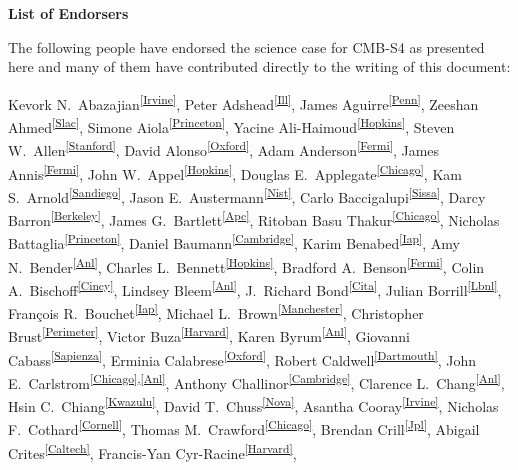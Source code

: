 \begin{center}
\textbf{List of Endorsers}
\end{center}

The following people have endorsed the science case for CMB-S4 as presented here and many of them have contributed directly to the writing of this document:

Kevork N.~Abazajian\textsuperscript{\ref{Irvine}},
Peter Adshead\textsuperscript{\ref{Ill}},
James Aguirre\textsuperscript{\ref{Penn}},
Zeeshan Ahmed\textsuperscript{\ref{Slac}},
Simone Aiola\textsuperscript{\ref{Princeton}},
Yacine Ali-Haimoud\textsuperscript{\ref{Hopkins}},
Steven W.~Allen\textsuperscript{\ref{Stanford}},
David Alonso\textsuperscript{\ref{Oxford}},
Adam Anderson\textsuperscript{\ref{Fermi}},
James Annis\textsuperscript{\ref{Fermi}},
John W.~Appel\textsuperscript{\ref{Hopkins}}, 
Douglas E.~Applegate\textsuperscript{\ref{Chicago}}, 
Kam S.~Arnold\textsuperscript{\ref{Sandiego}}, 
Jason E.~Austermann\textsuperscript{\ref{Nist}},
Carlo Baccigalupi\textsuperscript{\ref{Sissa}}, 
Darcy Barron\textsuperscript{\ref{Berkeley}}, 
James G.~Bartlett\textsuperscript{\ref{Apc}}, 
Ritoban Basu Thakur\textsuperscript{\ref{Chicago}},
Nicholas Battaglia\textsuperscript{\ref{Princeton}},
Daniel Baumann\textsuperscript{\ref{Cambridge}},
Karim Benabed\textsuperscript{\ref{Iap}}, 
Amy N.~Bender\textsuperscript{\ref{Anl}}, 
Charles L.~Bennett\textsuperscript{\ref{Hopkins}},
Bradford A.~Benson\textsuperscript{\ref{Fermi}},
Colin A.~Bischoff\textsuperscript{\ref{Cincy}},
Lindsey Bleem\textsuperscript{\ref{Anl}}, 
J.~Richard Bond\textsuperscript{\ref{Cita}}, 
Julian Borrill\textsuperscript{\ref{Lbnl}}, 
François R.~Bouchet\textsuperscript{\ref{Iap}}, 
Michael L.~Brown\textsuperscript{\ref{Manchester}},
Christopher Brust\textsuperscript{\ref{Perimeter}}, 
Victor Buza\textsuperscript{\ref{Harvard}}, 
Karen Byrum\textsuperscript{\ref{Anl}}, 
Giovanni Cabass\textsuperscript{\ref{Sapienza}}, 
Erminia Calabrese\textsuperscript{\ref{Oxford}}, 
Robert Caldwell\textsuperscript{\ref{Dartmouth}}, 
John E.~Carlstrom\textsuperscript{\ref{Chicago},\ref{Anl}}, 
Anthony Challinor\textsuperscript{\ref{Cambridge}}, 
Clarence L.~Chang\textsuperscript{\ref{Anl}}, 
Hsin C.~Chiang\textsuperscript{\ref{Kwazulu}},
David T.~Chuss\textsuperscript{\ref{Nova}},
Asantha Cooray\textsuperscript{\ref{Irvine}}, 
Nicholas F.~Cothard\textsuperscript{\ref{Cornell}}, 
Thomas M.~Crawford\textsuperscript{\ref{Chicago}}, 
Brendan Crill\textsuperscript{\ref{Jpl}},
Abigail Crites\textsuperscript{\ref{Caltech}},
Francis-Yan Cyr-Racine\textsuperscript{\ref{Harvard}},
